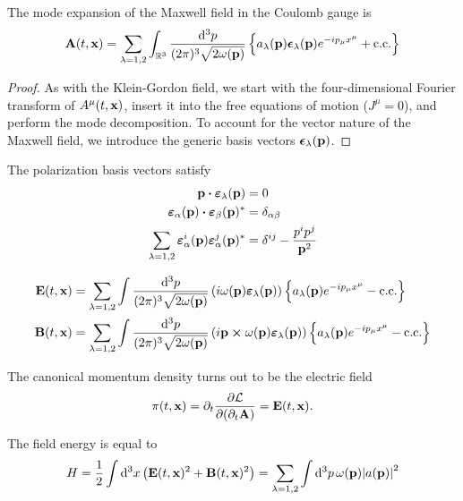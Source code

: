 \begin{theorem}
	The mode expansion of the Maxwell field in the Coulomb gauge is
	\begin{equation}
		\vb{A}(t,\vb{x})
		=
		\sum_{\lambda=1,2}
		\int_{\mathbb{R}^3}\frac{\dd[3]{p}}{(2\pi)^3\sqrt{2\omega(\vb{p})}}
		\left\{
			a_\lambda(\vb{p})
			\boldsymbol{\epsilon}_\lambda(\vb{p})
			e^{-ip_\mu x^\mu}
			+
			\text{c.c.}
		\right\}
		\label{eq:mw_ft}
	\end{equation}
\end{theorem}
\begin{proof}
	As with the Klein-Gordon field, we start with the four-dimensional Fourier transform of $A^\mu(t,\vb{x})$, insert it into the free equations of motion ($J^\mu=0$), and perform the mode decomposition.
	To account for the vector nature of the Maxwell field, we introduce the generic basis vectors $\boldsymbol{\epsilon}_\lambda(\vb{p})$.
\end{proof}
\begin{theorem}
	The polarization basis vectors satisfy~\cite[p.~341]{Srednicki2007}
	\begin{align}
		\vb{p}
		\vdot
		\boldsymbol{\varepsilon}_\lambda(\vb{p})
		&=
		0
		\\
		\boldsymbol{\varepsilon}_\alpha(\vb{p})
		\vdot
		\boldsymbol{\varepsilon}_\beta(\vb{p})^*
		&=
		\delta_{\alpha\beta}
		\\
		\sum_{\lambda=1,2}
		\boldsymbol{\varepsilon}_\alpha^i(\vb{p})
		\boldsymbol{\varepsilon}_\alpha^j(\vb{p})^*
		&=
		\delta^{ij}
		-
		\frac{p^ip^j}{\vb{p}^2}
	\end{align}
\end{theorem}
\begin{theorem}
	\begin{align}
		\vb{E}(t,\vb{x})
		&=
		\sum_{\lambda=1,2}
		\int\frac{\dd[3]{p}}{(2\pi)^3\sqrt{2\omega(\vb{p})}}
		\left(
			i\omega(\vb{p})
			\boldsymbol{\varepsilon}_\lambda(\vb{p})
		\right)
		\left\{
			a_\lambda(\vb{p})
			e^{-ip_\mu x^\mu}
			-
			\text{c.c.}
		\right\}
		\\
		\vb{B}(t,\vb{x})
		&=
		\sum_{\lambda=1,2}
		\int\frac{\dd[3]{p}}{(2\pi)^3\sqrt{2\omega(\vb{p})}}
		\left(
			i\vb{p}\cross\omega(\vb{p})
			\boldsymbol{\varepsilon}_\lambda(\vb{p})
		\right)
		\left\{
			a_\lambda(\vb{p})
			e^{-ip_\mu x^\mu}
			-
			\text{c.c.}
		\right\}
	\end{align}
\end{theorem}
\begin{lemma}
	The canonical momentum density turns out to be the electric field
	\begin{equation}
		\pi(t,\vb{x})
		=
		\partial_t\pdv{\mathcal{L}}{(\partial_t\vb{A})}
		=
		\vb{E}(t,\vb{x})
		\label{eq:mw_mom}.
	\end{equation}
\end{lemma}
\begin{lemma}\label{thm:mw_energy}
	The field energy is equal to
	\begin{equation}
		H
		=
		\frac{1}{2}
		\int\dd[3]{x}
		\left(
			\vb{E}(t,\vb{x})^2
			+
			\vb{B}(t,\vb{x})^2
		\right)
		=
		\sum_{\lambda=1,2}
		\int\dd[3]{p}
		\omega(\vb{p})
		\abs{a(\vb{p})}^2
	\end{equation}
\end{lemma}
